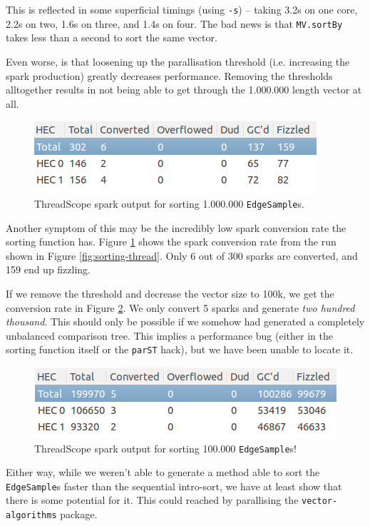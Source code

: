 \documentclass[12pt, a4paper]{article}
\begin{document}
This is reflected in some superficial timings (using \texttt{-s}) -- taking 3.2s on one core, 2.2s on two, 1.6s on three, and 1.4s on four. The bad news is that \texttt{MV.sortBy} takes less than a second to sort the same vector.

Even worse, is that loosening up the parallisation threshold (i.e. increasing the spark production)
greatly decreases performance. Removing the thresholds alltogether results in not being able to get
 through the 1.000.000 length vector at all.
 \begin{figure}[h!]
  \centering
  \includegraphics[width=0.6\linewidth]{../threadscope/sorting/sorting-final-sparks}
  \caption{ThreadScope spark output for sorting 1.000.000 \texttt{EdgeSample}s.}
  \label{fig:sorting-thread-sparks}
\end{figure}

Another symptom of this may be the incredibly low spark conversion rate the sorting function has.
Figure \ref{fig:sorting-thread-sparks} shows the spark conversion rate from the run shown in
Figure \ref{fig:sorting-thread}. Only 6 out of 300 sparks are converted, and 159 end up fizzling.


If we remove the threshold and decrease the vector size to 100k, we get the conversion rate in
Figure \ref{fig:sorting-thread-100k-sparks}. We only convert 5 sparks and generate \textit{two hundred thousand}. This should only be possible if we somehow had generated
a completely unbalanced comparison tree. This implies a performance bug (either in the sorting function
 itself or the \texttt{parST} hack), but we have been unable to locate it.
 \begin{figure}[h!]
  \centering
  \includegraphics[width=0.6\linewidth]{../threadscope/sorting/sorting-100k-sparks}
  \caption{ThreadScope spark output for sorting 100.000 \texttt{EdgeSample}s!}
  \label{fig:sorting-thread-100k-sparks}
\end{figure}

Either way, while we weren't able to generate a method able to sort the \texttt{EdgeSample}s faster
than the sequential intro-sort, we have at least show that there is some potential for it. This
 could reached by parallising the \texttt{vector-algorithms} package.
\end{document}
